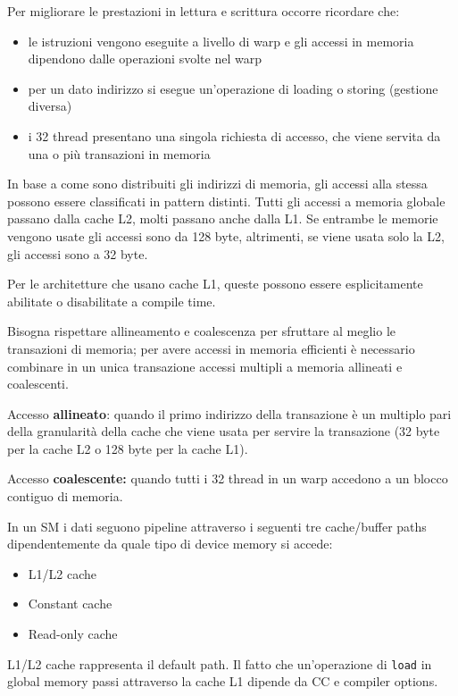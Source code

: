 Per migliorare le prestazioni in lettura e scrittura occorre ricordare che: 
\begin{itemize}
	\item le istruzioni vengono eseguite a livello di warp e gli accessi in memoria dipendono dalle operazioni svolte nel warp
    
	\item per un dato indirizzo si esegue un'operazione di loading o storing (gestione diversa)
	
    \item i 32 thread presentano una singola richiesta di accesso, che viene servita da una o più transazioni in memoria
\end{itemize}

In base a come sono distribuiti gli indirizzi di memoria, gli accessi alla stessa possono essere classificati in pattern distinti. Tutti gli accessi a memoria globale passano dalla cache L2, molti passano anche dalla L1. Se entrambe le memorie vengono usate gli accessi sono da 128 byte, altrimenti, se viene usata solo la L2, gli accessi sono a 32 byte.

Per le architetture che usano cache L1, queste possono essere esplicitamente abilitate o disabilitate a compile time.

Bisogna rispettare allineamento e coalescenza per sfruttare al meglio le transazioni di memoria; per avere accessi in memoria efficienti è necessario combinare in un unica transazione accessi multipli a memoria allineati e coalescenti.

Accesso \textbf{allineato}: quando il primo indirizzo della transazione è un multiplo pari della granularità della cache che viene usata per servire la transazione (32 byte per la cache L2 o 128 byte per la cache L1).

Accesso \textbf{coalescente:} quando tutti i 32 thread in un warp accedono a un blocco contiguo di memoria.

In un SM i dati seguono pipeline attraverso i seguenti tre cache/buffer paths dipendentemente da quale tipo di device memory si accede:
\begin{itemize}
	\item L1/L2 cache
    
	\item Constant cache
	
    \item Read-only cache
\end{itemize}

L1/L2 cache rappresenta il default path. Il fatto che un'operazione di \texttt{load} in global memory passi attraverso la cache L1 dipende da CC e compiler options.

